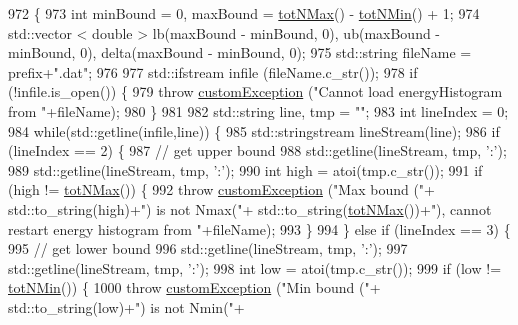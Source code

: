 \begin{DoxyCode}
972                                                               \{
973     \textcolor{keywordtype}{int} minBound = 0, maxBound = \hyperlink{classsim_system_aee2c65ecb43a35c0c4d070cdb45f7dc0}{totNMax}() - \hyperlink{classsim_system_af10842e0eaa638373b8717c87b47e6bc}{totNMin}() + 1;
974     std::vector < double > lb(maxBound - minBound, 0), ub(maxBound - minBound, 0), delta(maxBound - 
      minBound, 0);
975     std::string fileName = prefix+\textcolor{stringliteral}{".dat"};
976 
977     std::ifstream infile (fileName.c\_str());
978     \textcolor{keywordflow}{if} (!infile.is\_open()) \{
979         \textcolor{keywordflow}{throw} \hyperlink{classcustom_exception}{customException} (\textcolor{stringliteral}{"Cannot load energyHistogram from "}+fileName);
980     \}
981 
982     std::string line, tmp = \textcolor{stringliteral}{""};
983     \textcolor{keywordtype}{int} lineIndex = 0;
984     \textcolor{keywordflow}{while}(std::getline(infile,line)) \{
985         std::stringstream lineStream(line);
986         \textcolor{keywordflow}{if} (lineIndex == 2) \{
987             \textcolor{comment}{// get upper bound}
988             std::getline(lineStream, tmp, \textcolor{charliteral}{':'});
989             std::getline(lineStream, tmp, \textcolor{charliteral}{':'});
990             \textcolor{keywordtype}{int} high = atoi(tmp.c\_str());
991             \textcolor{keywordflow}{if} (high != \hyperlink{classsim_system_aee2c65ecb43a35c0c4d070cdb45f7dc0}{totNMax}()) \{
992                 \textcolor{keywordflow}{throw} \hyperlink{classcustom_exception}{customException} (\textcolor{stringliteral}{"Max bound ("}+ std::to\_string(high)+\textcolor{stringliteral}{") is not Nmax("}+
      std::to\_string(\hyperlink{classsim_system_aee2c65ecb43a35c0c4d070cdb45f7dc0}{totNMax}())+\textcolor{stringliteral}{"), cannot restart energy histogram from "}+fileName);
993             \}
994         \} \textcolor{keywordflow}{else} \textcolor{keywordflow}{if} (lineIndex == 3) \{
995             \textcolor{comment}{// get lower bound}
996             std::getline(lineStream, tmp, \textcolor{charliteral}{':'});
997             std::getline(lineStream, tmp, \textcolor{charliteral}{':'});
998             \textcolor{keywordtype}{int} low = atoi(tmp.c\_str());
999             \textcolor{keywordflow}{if} (low != \hyperlink{classsim_system_af10842e0eaa638373b8717c87b47e6bc}{totNMin}()) \{
1000                 \textcolor{keywordflow}{throw} \hyperlink{classcustom_exception}{customException} (\textcolor{stringliteral}{"Min bound ("}+ std::to\_string(low)+\textcolor{stringliteral}{") is not Nmin("}+

\end{DoxyCode}
